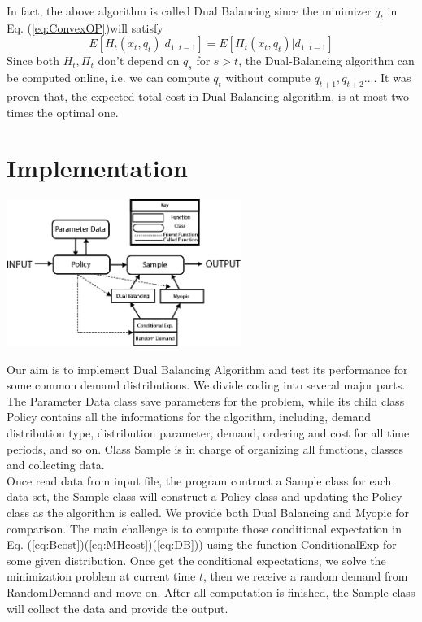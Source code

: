 \documentclass[twoside]{article}
\begin{document}
\begin{multicols}{2}
    In fact, the above algorithm is called Dual Balancing since the minimizer $q_t$ in Eq. (\ref{eq:ConvexOP})will satisfy
    \begin{equation}\label{eq:DB}
        E[H_t(x_t,q_t)| d_{1..t-1}] = E[\Pi_t(x_t,q_t)| d_{1..t-1}]
        \end{equation}
      Since both $H_t,\Pi_t$ don't depend on $q_s$ for $s>t$, the Dual-Balancing algorithm can be computed online, i.e. we can compute $q_t$ without compute $q_{t+1}, q_{t+2} ... $. It was proven that, the expected total cost in Dual-Balancing algorithm,  is at most two times the optimal one\cite{CLAcha2}.


\section{Implementation}


\begin{center}
  \label{figure:software_diagram}
  \includegraphics[width=3.0in]{software_diagram.png}
\end{center}
Our aim is to implement Dual Balancing Algorithm and test its performance for some common demand distributions. We divide coding into several major parts. The Parameter Data class save parameters for the problem, while its child class Policy contains all the informations for the algorithm, including, demand distribution type, distribution parameter, demand, ordering and cost for all time periods, and so on. Class Sample is in charge of organizing all functions, classes and collecting data.\\
Once read data from input file, the program contruct a Sample class for each data set, the Sample class will construct a Policy class and updating the Policy class as the algorithm is called. We provide both Dual Balancing and Myopic for comparison. The main challenge is to compute those conditional expectation in Eq. (\ref{eq:Bcost})(\ref{eq:MHcost})(\ref{eq:DB})) using the function ConditionalExp for some given distribution. Once get the conditional expectations, we solve the minimization problem at current time $t$, then we receive a random demand from RandomDemand and move on. After all computation is finished, the Sample class will collect the data and provide the output.




\end{multicols}
\end{document}
